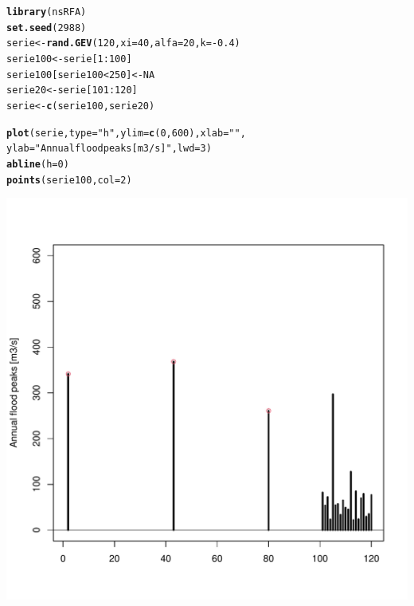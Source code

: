 \documentclass{tufte-handout}\usepackage[]{graphicx}\usepackage[]{xcolor}
\makeatletter
\def\maxwidth{ %
  \ifdim\Gin@nat@width>\linewidth
    \linewidth
  \else
    \Gin@nat@width
  \fi
}
\newcommand{\hlnum}[1]{\textcolor[rgb]{0.686,0.059,0.569}{#1}}%
\newcommand{\hlstr}[1]{\textcolor[rgb]{0.192,0.494,0.8}{#1}}%
\newcommand{\hlopt}[1]{\textcolor[rgb]{0,0,0}{#1}}%
\newcommand{\hlstd}[1]{\textcolor[rgb]{0.345,0.345,0.345}{#1}}%
\newcommand{\hlkwb}[1]{\textcolor[rgb]{0.69,0.353,0.396}{#1}}%
\newcommand{\hlkwc}[1]{\textcolor[rgb]{0.333,0.667,0.333}{#1}}%
\newcommand{\hlkwd}[1]{\textcolor[rgb]{0.737,0.353,0.396}{\textbf{#1}}}%
\newenvironment{kframe}{%
 \def\at@end@of@kframe{}%
 \ifinner\ifhmode%
  \def\at@end@of@kframe{\end{minipage}}%
  \begin{minipage}{\columnwidth}%
 \fi\fi%
 \def\FrameCommand##1{\hskip\@totalleftmargin \hskip-\fboxsep
 \colorbox{shadecolor}{##1}\hskip-\fboxsep
     \hskip-\linewidth \hskip-\@totalleftmargin \hskip\columnwidth}%
 \MakeFramed {\advance\hsize-\width
   \@totalleftmargin\z@ \linewidth\hsize
   \@setminipage}}%
 {\par\unskip\endMakeFramed%
 \at@end@of@kframe}
\newenvironment{knitrout}{}{} %
\makeatother
\begin{document}
\begin{knitrout}
\color{fgcolor}\begin{kframe}
\begin{alltt}
\hlkwd{library}\hlstd{(nsRFA)}
\hlkwd{set.seed}\hlstd{(}\hlnum{2988}\hlstd{)}
\hlstd{serie} \hlkwb{<-} \hlkwd{rand.GEV}\hlstd{(}\hlnum{120}\hlstd{,} \hlkwc{xi}\hlstd{=}\hlnum{40}\hlstd{,} \hlkwc{alfa}\hlstd{=}\hlnum{20}\hlstd{,} \hlkwc{k}\hlstd{=}\hlopt{-}\hlnum{0.4}\hlstd{)}
\hlstd{serie100} \hlkwb{<-} \hlstd{serie[}\hlnum{1}\hlopt{:}\hlnum{100}\hlstd{]}
\hlstd{serie100[serie100} \hlopt{<} \hlnum{250}\hlstd{]} \hlkwb{<-} \hlnum{NA}
\hlstd{serie20} \hlkwb{<-} \hlstd{serie[}\hlnum{101}\hlopt{:}\hlnum{120}\hlstd{]}
\hlstd{serie} \hlkwb{<-} \hlkwd{c}\hlstd{(serie100, serie20)}


\hlkwd{plot}\hlstd{(serie,} \hlkwc{type}\hlstd{=}\hlstr{"h"}\hlstd{,} \hlkwc{ylim}\hlstd{=}\hlkwd{c}\hlstd{(}\hlnum{0}\hlstd{,} \hlnum{600}\hlstd{),} \hlkwc{xlab}\hlstd{=}\hlstr{""}\hlstd{,}
     \hlkwc{ylab}\hlstd{=}\hlstr{"Annual flood peaks [m3/s]"}\hlstd{,} \hlkwc{lwd}\hlstd{=}\hlnum{3}\hlstd{)}
\hlkwd{abline}\hlstd{(}\hlkwc{h}\hlstd{=}\hlnum{0}\hlstd{)}
\hlkwd{points}\hlstd{(serie100,} \hlkwc{col}\hlstd{=}\hlnum{2}\hlstd{)}
\end{alltt}
\end{kframe}
\includegraphics[width=\maxwidth]{figure/unnamed-chunk-3-1} 
\end{knitrout}
\end{document}
